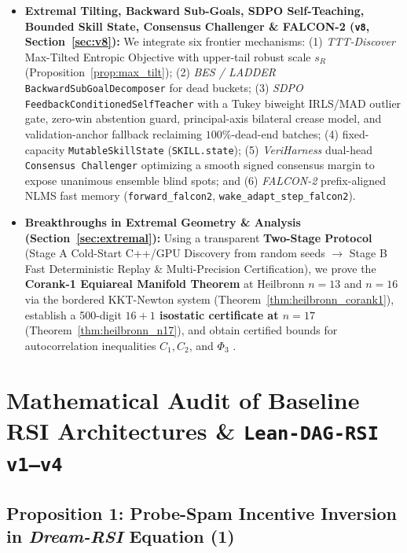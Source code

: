 \documentclass[11pt,a4paper]{article}
\begin{document}
\begin{itemize}
\item \textbf{Extremal Tilting, Backward Sub-Goals, SDPO Self-Teaching, Bounded Skill State, Consensus Challenger \& FALCON-2 (\texttt{v8}, Section~\ref{sec:v8}):} We integrate six frontier mechanisms: (1) \emph{TTT-Discover} Max-Tilted Entropic Objective with upper-tail robust scale $s_R$ (Proposition~\ref{prop:max_tilt}); (2) \emph{BES / LADDER} \texttt{BackwardSubGoalDecomposer} for dead buckets; (3) \emph{SDPO} \texttt{FeedbackConditionedSelfTeacher} with a Tukey biweight IRLS/MAD outlier gate, zero-win abstention guard, principal-axis bilateral crease model, and validation-anchor fallback reclaiming $100\%$-dead-end batches; (4) fixed-capacity \texttt{MutableSkillState} (\texttt{SKILL.state}); (5) \emph{VeriHarness} dual-head \texttt{Consensus Challenger} optimizing a smooth signed consensus margin to expose unanimous ensemble blind spots; and (6) \emph{FALCON-2} prefix-aligned NLMS fast memory (\texttt{forward\_falcon2}, \texttt{wake\_adapt\_step\_falcon2}).
\item \textbf{Breakthroughs in Extremal Geometry \& Analysis (Section~\ref{sec:extremal}):} Using a transparent \textbf{Two-Stage Protocol} (Stage A Cold-Start C++/GPU Discovery from random seeds $\to$ Stage B Fast Deterministic Replay \& Multi-Precision Certification), we prove the \textbf{Corank-1 Equiareal Manifold Theorem} at Heilbronn $n=13$ and $n=16$ via the bordered KKT-Newton system (Theorem~\ref{thm:heilbronn_corank1}), establish a 500-digit \textbf{$16+1$ isostatic certificate at $n=17$} (Theorem~\ref{thm:heilbronn_n17}), and obtain certified bounds for autocorrelation inequalities $C_1, C_2$, and $\Phi_3$ \cite{matolcsi2010,cilleruelo2010,jaech2025,cantrell2007,stead2026}.
\end{itemize}

\section{Mathematical Audit of Baseline RSI Architectures \& \texttt{Lean-DAG-RSI v1--v4}}
\label{sec:audit}

\subsection{Proposition 1: Probe-Spam Incentive Inversion in \emph{Dream-RSI} Equation (1)}
\end{document}
